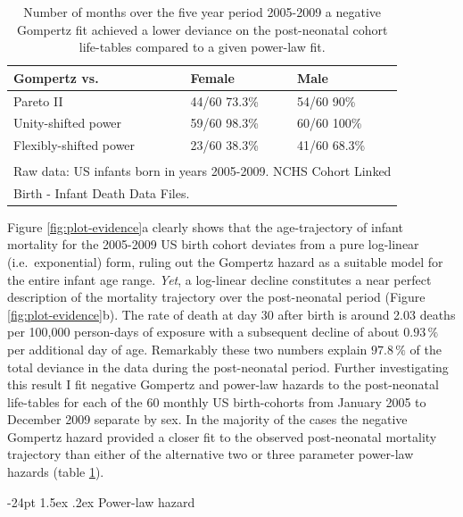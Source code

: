 \documentclass[10pt, twoside, parskip=half]{article}
\makeatletter
\renewcommand\subsection{\@startsection{subsection}{2}{\z@}%
                                     {-24pt}%
                                     {1.5ex \@plus .2ex}%
                                     {\normalfont\normalsize\bfseries}}
\makeatother
\begin{document}
\begin{table}[t]

\caption{\label{tab:tab-postneonatal}Number of months over the five year period 2005-2009 a negative Gompertz fit achieved a lower deviance on the post-neonatal cohort life-tables compared to a given power-law fit.}
\centering
\begin{tabular}{lll}
\toprule
\textbf{Gompertz vs.} & \textbf{Female} & \textbf{Male}\\
\midrule
Pareto II & 44/60 73.3\% & 54/60   90\%\\
Unity-shifted power & 59/60 98.3\% & 60/60  100\%\\
Flexibly-shifted power & 23/60 38.3\% & 41/60 68.3\%\\
\bottomrule
\multicolumn{3}{l}{\textsuperscript{} Raw data: US infants born in years 2005-2009. NCHS Cohort Linked}\\
\multicolumn{3}{l}{Birth - Infant Death Data Files.}\\
\end{tabular}
\end{table}

Figure \ref{fig:plot-evidence}a clearly shows that the age-trajectory of
infant mortality for the 2005-2009 US birth cohort deviates from a pure
log-linear (i.e.~exponential) form, ruling out the Gompertz hazard as a
suitable model for the entire infant age range. \emph{Yet}, a log-linear
decline constitutes a near perfect description of the mortality
trajectory over the post-neonatal period (Figure
\ref{fig:plot-evidence}b). The rate of death at day 30 after birth is
around 2.03 deaths per 100,000 person-days of exposure with a subsequent
decline of about \(0.93\,\%\) per additional day of age. Remarkably
these two numbers explain \(97.8\,\%\) of the total deviance in the data
during the post-neonatal period. Further investigating this result I fit
negative Gompertz and power-law hazards to the post-neonatal life-tables
for each of the 60 monthly US birth-cohorts from January 2005 to
December 2009 separate by sex. In the majority of the cases the negative
Gompertz hazard provided a closer fit to the observed post-neonatal
mortality trajectory than either of the alternative two or three
parameter power-law hazards (table \ref{tab:tab-postneonatal}).

\subsection{Power-law hazard}\label{power-law-hazard}
\end{document}

